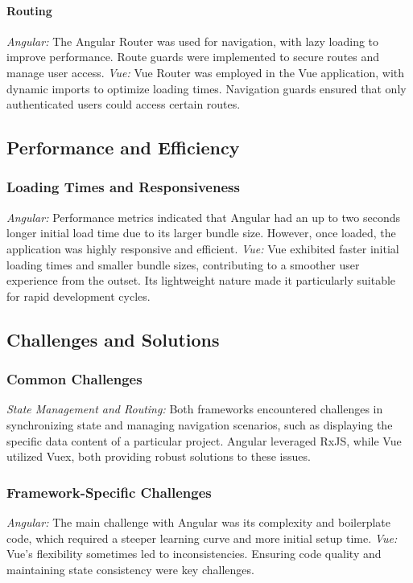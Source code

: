 \documentclass[conference]{IEEEtran}
\begin{document}
\paragraph{Routing}
\textit{Angular: }The Angular Router was used for navigation, with lazy loading to improve performance. Route guards were implemented to secure routes and manage user access.
\newline\textit{Vue: }Vue Router was employed in the Vue application, with dynamic imports to optimize loading times. Navigation guards ensured that only authenticated users could access certain routes.

\subsection{Performance and Efficiency}
\subsubsection{Loading Times and Responsiveness}
\textit{Angular: }Performance metrics indicated that Angular had an up to two seconds longer initial load time due to its larger bundle size. However, once loaded, the application was highly responsive and efficient.
\newline\textit{Vue: }Vue exhibited faster initial loading times and smaller bundle sizes, contributing to a smoother user experience from the outset. Its lightweight nature made it particularly suitable for rapid development cycles.
\subsection{Challenges and Solutions}
\subsubsection{Common Challenges}
\textit{State Management and Routing:} Both frameworks encountered challenges in synchronizing state and managing navigation scenarios, such as displaying the specific data content of a particular project. Angular leveraged RxJS, while Vue utilized Vuex, both providing robust solutions to these issues.
\subsubsection{Framework-Specific Challenges}
\textit{Angular: }The main challenge with Angular was its complexity and boilerplate code, which required a steeper learning curve and more initial setup time.
\newline\textit{Vue: }Vue's flexibility sometimes led to inconsistencies. Ensuring code quality and maintaining state consistency were key challenges.
\end{document}
